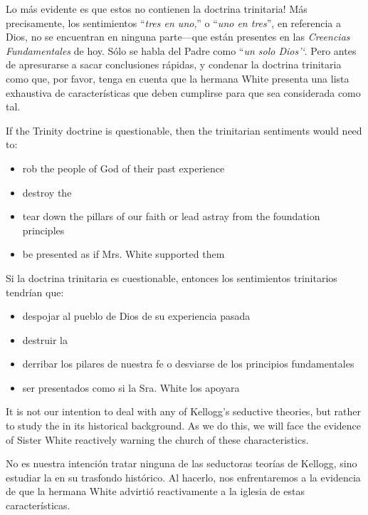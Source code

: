 Lo más evidente es que estos  no contienen la doctrina trinitaria! Más precisamente, los sentimientos “\textit{tres en uno},” o “\textit{uno en tres}”, en referencia a Dios, no se encuentran en ninguna parte—que están presentes en las \textit{Creencias Fundamentales} de hoy. Sólo se habla del Padre como “\textit{un solo Dios’‘}. Pero antes de apresurarse a sacar conclusiones rápidas, y condenar la doctrina trinitaria como que, por favor, tenga en cuenta que la hermana White presenta una lista exhaustiva de características que deben cumplirse para que sea considerada como tal.


If the Trinity doctrine is questionable, then the trinitarian sentiments would need to:
\begin{itemize}
    \item rob the people of God of their past experience
    \item destroy the 
    \item tear down the pillars of our faith or lead astray from the foundation principles
    \item be presented as if Mrs. White supported them
\end{itemize}


Si la doctrina trinitaria es cuestionable, entonces los sentimientos trinitarios tendrían que:
\begin{itemize}
    \item despojar al pueblo de Dios de su experiencia pasada
    \item destruir la 
    \item derribar los pilares de nuestra fe o desviarse de los principios fundamentales
    \item ser presentados como si la Sra. White los apoyara
\end{itemize}


It is not our intention to deal with any of Kellogg’s seductive theories, but rather to study the  in its historical background. As we do this, we will face the evidence of Sister White reactively warning the church of these characteristics.


No es nuestra intención tratar ninguna de las seductoras teorías de Kellogg, sino estudiar la  en su trasfondo histórico. Al hacerlo, nos enfrentaremos a la evidencia de que la hermana White advirtió reactivamente a la iglesia de estas características.






